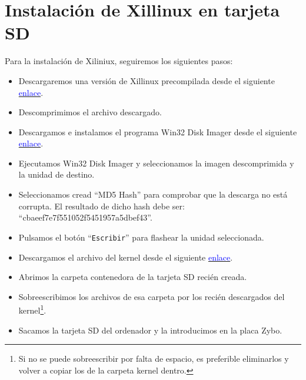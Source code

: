 \documentclass[12pt,letterpaper]{article}
\begin{document}
\section{Instalación de Xillinux en tarjeta SD}
Para la instalación de Xiliniux, seguiremos los siguientes pasos:
\begin{itemize}
	\item Descargaremos una versión de Xillinux precompilada desde el siguiente \href{https://www.dropbox.com/s/9qgcoyjzoi764f0/2016.02.02.debian-cbaeef7e7f551052f5451957a5dbef43.zip?dl=0}{\textcolor{blue}{enlace}}.
	\item Descomprimimos el archivo descargado.
	\item Descargamos e instalamos el programa Win32 Disk Imager desde el siguiente \href{https://dw.uptodown.com/dwn/w76tVn7onjw1uZFTLSx7oG5vt1Y7gsfE_vPZCAa88I4YqL5Lp6S__CQhpJZGOLPYdjr73a4yGULPiRxv8Z2IsSRQjRPewPceg1Ol2gDzH3IkO3MHOCcuKQCNZwYI9Pvt/8_NYEhYYhGoJ_QXK-PQtvMDn5aHkqiWxwMofLuT2S5SxxDw2zu6f1OMCW0kqLnB0PGf-zrvou_F_nzjB4fn6Nuvp3WZcVrkFzGgNrhVLInDUMHPM0Jfxh76lJU_IATF7/9xrSlUN8npqZOVysN4LIc5iQnXIPmWNSWKNBLv7hcuQxXmyjX8qERxO48SnXIgr83mVVF-bcUsWJGGryhVqZ_LiBsoZmxxEyZE5JXoqVhCI=/}{\textcolor{blue}{enlace}}.
	\item Ejecutamos Win32 Disk Imager y seleccionamos la imagen descomprimida y la unidad de destino.
	\item Seleccionamos cread ``MD5 Hash'' para comprobar que la descarga no está corrupta. El resultado de dicho hash debe ser: ``cbaeef7e7f551052f5451957a5dbef43''.
	\item Pulsamos el botón ``\texttt{Escribir}'' para flashear la unidad seleccionada.
	\item Descargamos el archivo del kernel desde el siguiente \href{https://uc405c43ce82f6c3032b21ba76bf.dl.dropboxusercontent.com/cd/0/get/AehqJhpiTxZ90sAdGxOFqHxr04BAsug_4RaV6MPX5yBDOQBVaIpDw11X6LdVBi7DPsndN7IxeWYRcEmUAt4xnKoIeYJBRtYu4JtZ_M71as8xbw/file?_download_id=621489597300519201006251662619095482850364296264714456845096204891&_notify_domain=www.dropbox.com&dl=1}{\textcolor{blue}{enlace}}.
	\item Abrimos la carpeta contenedora de la tarjeta SD recién creada.
	\item Sobreescribimos los archivos de esa carpeta por los recién descargados del kernel\footnote{Si no se puede sobreescribir por falta de espacio, es preferible eliminarlos y volver a copiar los de la carpeta kernel dentro.}.
	\item Sacamos la tarjeta SD del ordenador y la introducimos en la placa Zybo.
\end{itemize}
\end{document}
